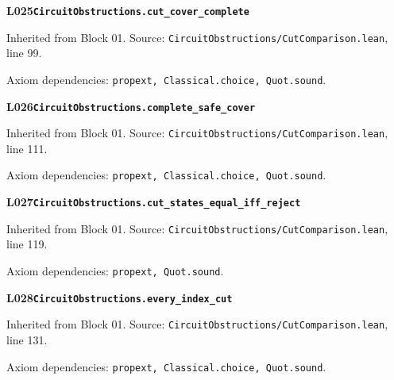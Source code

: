 \begin{minipage}{\linewidth}
\hypertarget{L025}{}
{\small\sffamily\bfseries\color{ink}L025\quad\nolinkurl{CircuitObstructions.cut_cover_complete}}\par
{\scriptsize\sffamily\color{muted}Inherited from Block 01. Source: \nolinkurl{CircuitObstructions/CutComparison.lean}, line 99.}\par
{}
{\scriptsize\sffamily\color{muted}Axiom dependencies: \nolinkurl{propext, Classical.choice, Quot.sound}.}
\end{minipage}\par\medskip
{}\par\medskip
\begin{minipage}{\linewidth}
\hypertarget{L026}{}
{\small\sffamily\bfseries\color{ink}L026\quad\nolinkurl{CircuitObstructions.complete_safe_cover}}\par
{\scriptsize\sffamily\color{muted}Inherited from Block 01. Source: \nolinkurl{CircuitObstructions/CutComparison.lean}, line 111.}\par
{}
{\scriptsize\sffamily\color{muted}Axiom dependencies: \nolinkurl{propext, Classical.choice, Quot.sound}.}
\end{minipage}\par\medskip
\begin{minipage}{\linewidth}
\hypertarget{L027}{}
{\small\sffamily\bfseries\color{ink}L027\quad\nolinkurl{CircuitObstructions.cut_states_equal_iff_reject}}\par
{\scriptsize\sffamily\color{muted}Inherited from Block 01. Source: \nolinkurl{CircuitObstructions/CutComparison.lean}, line 119.}\par
{}
{\scriptsize\sffamily\color{muted}Axiom dependencies: \nolinkurl{propext, Quot.sound}.}
\end{minipage}\par\medskip
\begin{minipage}{\linewidth}
\hypertarget{L028}{}
{\small\sffamily\bfseries\color{ink}L028\quad\nolinkurl{CircuitObstructions.every_index_cut}}\par
{\scriptsize\sffamily\color{muted}Inherited from Block 01. Source: \nolinkurl{CircuitObstructions/CutComparison.lean}, line 131.}\par
{}
{\scriptsize\sffamily\color{muted}Axiom dependencies: \nolinkurl{propext, Classical.choice, Quot.sound}.}
\end{minipage}\par\medskip
